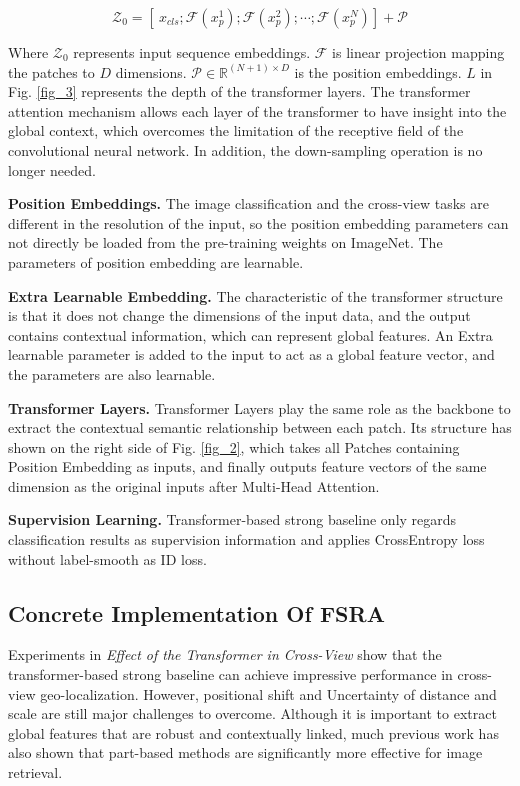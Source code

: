 \documentclass[lettersize,journal]{IEEEtran}
\begin{document}
\begin{equation}
\label{eq1}
\mathcal{Z}_0=[{\ x}_{cls};\mathcal{F}(x_p^1);\mathcal{F}(x_p^2);\cdots{};\mathcal{F}(x_p^N)]+\mathcal{P}
\end{equation}

Where $\mathcal{Z}_0$ represents input sequence embeddings. $\mathcal{F}$ is linear projection mapping the patches to $D$ dimensions. $\mathcal{P}\in{\mathbb{R}^{(N+1)\times{D}}}$ is the position embeddings. $L$ in Fig. \ref{fig_3} represents the depth of the transformer layers. The transformer attention mechanism allows each layer of the transformer to have insight into the global context, which overcomes the limitation of the receptive field of the convolutional neural network. In addition, the down-sampling operation is no longer needed.

\textbf{Position Embeddings.} The image classification and the cross-view tasks are different in the resolution of the input, so the position embedding parameters can not directly be loaded from the pre-training weights on ImageNet. The parameters of position embedding are learnable.

\textbf{Extra Learnable Embedding.} The characteristic of the transformer structure is that it does not change the dimensions of the input data, and the output contains contextual information, which can represent global features. An Extra learnable parameter is added to the input to act as a global feature vector, and the parameters are also learnable.

\textbf{Transformer Layers.} Transformer Layers play the same role as the backbone to extract the contextual semantic relationship between each patch. Its structure has shown on the right side of Fig. \ref{fig_2}, which takes all Patches containing Position Embedding as inputs, and finally outputs feature vectors of the same dimension as the original inputs after Multi-Head Attention.
	
\textbf{Supervision Learning.} Transformer-based strong baseline only regards classification results as supervision information and applies CrossEntropy loss without label-smooth as ID loss. 

\subsection{Concrete Implementation Of FSRA}
Experiments in \emph{Effect of the Transformer in Cross-View} show that the transformer-based strong baseline can achieve impressive performance in cross-view geo-localization. However, positional shift and Uncertainty of distance and scale are still major challenges to overcome. Although it is important to extract global features that are robust and contextually linked, much previous work has also shown that part-based methods are significantly more effective for image retrieval.
\end{document}
